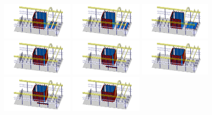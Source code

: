 \begin{figure}[!t]
\includegraphics[width=0.32\textwidth]{./Figures/assembly_sequence_11_07/26.png}
\includegraphics[width=0.32\textwidth]{./Figures/assembly_sequence_11_07/27.png}
\includegraphics[width=0.32\textwidth]{./Figures/assembly_sequence_11_07/28.png}
\includegraphics[width=0.32\textwidth]{./Figures/assembly_sequence_11_07/29.png}
\includegraphics[width=0.32\textwidth]{./Figures/assembly_sequence_11_07/30.png}
\includegraphics[width=0.32\textwidth]{./Figures/assembly_sequence_11_07/31.png}
\includegraphics[width=0.32\textwidth]{./Figures/assembly_sequence_11_07/32.png}
\includegraphics[width=0.32\textwidth]{./Figures/assembly_sequence_11_07/33.png}

\end{figure}
